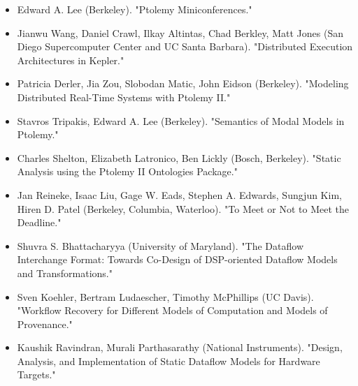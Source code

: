                  \begin{itemize}
                 \item Edward A. Lee (Berkeley). "Ptolemy
                   Miniconferences." \cite{Lee11_PtolemyMiniconferences} 
                 \item Jianwu Wang, Daniel Crawl, Ilkay Altintas, Chad Berkley, Matt
                   Jones (San Diego Supercomputer Center and UC Santa Barbara). "Distributed Execution Architectures in Kepler."
                   \cite{WangCrawlAltintasBerkleyJones11_DistributedExecutionArchitecturesInKepler}
                 \item Patricia Derler, Jia Zou, Slobodan Matic, John Eidson (Berkeley). "Modeling
                   Distributed Real-Time Systems with Ptolemy II."
                   \cite{DerlerZouMaticEidson11_ModelingDistributedRealTimeSystemsWithPtolemyII}
                 \item Stavros Tripakis, Edward A. Lee (Berkeley). "Semantics of Modal Models in
                   Ptolemy."
                   \cite{TripakisLee11_SemanticsOfModalModelsInPtolemy}
                 \item Charles Shelton, Elizabeth Latronico, Ben Lickly (Bosch, Berkeley). "Static
                   Analysis using the Ptolemy II Ontologies Package."
                   \cite{SheltonLatronicoLickly11_StaticAnalysisUsingPtolemyIIOntologiesPackage}
                 \item Jan Reineke, Isaac Liu, Gage W. Eads, Stephen A. Edwards,
                   Sungjun Kim, Hiren D. Patel (Berkeley, Columbia, Waterloo). "To Meet or Not to Meet the Deadline."
                   \cite{ReinekeLiuEadsEdwardsKimPatel11_ToMeetOrNotToMeetDeadline}
                 \item Shuvra S. Bhattacharyya (University of Maryland). "The Dataflow Interchange Format:
                   Towards Co-Design of DSP-oriented Dataflow Models and
                   Transformations." 
                   \cite{Bhattacharyya11_DataflowInterchangeFormatTowardsCoDesignOfDSPoriented}
                 \item Sven Koehler, Bertram Ludaescher, Timothy McPhillips (UC Davis). "Workflow Recovery for Different Models of Computation and Models of Provenance." 
                   \cite{KoehlerLudaescherMcPhillips11_WorkflowRecoveryForDifferentModelsOfComputationModels}
                 \item Kaushik Ravindran, Murali Parthasarathy (National Instruments). "Design, Analysis, and
                   Implementation of Static Dataflow Models for Hardware Targets."

\end{itemize}
